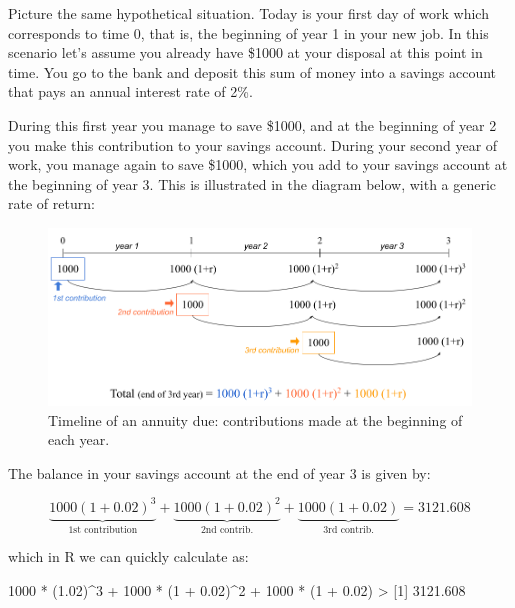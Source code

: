 \documentclass[
]{book}
\newenvironment{Shaded}{\begin{snugshade}}{\end{snugshade}}
\newcommand{\DecValTok}[1]{\textcolor[rgb]{0.00,0.00,0.81}{#1}}
\newcommand{\FloatTok}[1]{\textcolor[rgb]{0.00,0.00,0.81}{#1}}
\newcommand{\NormalTok}[1]{#1}
\newcommand{\SpecialCharTok}[1]{\textcolor[rgb]{0.00,0.00,0.00}{#1}}
\begin{document}
Picture the same hypothetical situation. Today is your first day of work
which corresponds to time 0, that is, the beginning of year 1 in your new job.
In this scenario let's assume you already have \$1000 at your disposal
at this point in time. You go to the bank and deposit this sum of money into a
savings account that pays an annual interest rate of 2\%.

During this first year you manage to save \$1000, and at the beginning of year 2
you make this contribution to your savings account. During your second year of
work, you manage again to save \$1000, which you add to your savings account at
the beginning of year 3. This is illustrated in the diagram below, with a
generic rate of return:

\begin{figure}

{\centering \includegraphics[width=0.95\linewidth]{images/conditionals/timeline-due-annuity} 

}

\caption{Timeline of an annuity due: contributions made at the beginning of each year.}\label{fig:unnamed-chunk-262}
\end{figure}

The balance in your savings account at the end of year 3 is given by:

\[
\underbrace{1000 (1 + 0.02)^3}_{\text{1st contribution}} + \underbrace{1000 (1 + 0.02)^2}_{\text{2nd contrib.}} + \underbrace{1000 (1 + 0.02)}_{\text{3rd contrib.}} = 3121.608
\]

which in R we can quickly calculate as:

\begin{Shaded}
\begin{Highlighting}[]
\DecValTok{1000} \SpecialCharTok{*}\NormalTok{ (}\FloatTok{1.02}\NormalTok{)}\SpecialCharTok{\^{}}\DecValTok{3} \SpecialCharTok{+} \DecValTok{1000} \SpecialCharTok{*}\NormalTok{ (}\DecValTok{1} \SpecialCharTok{+} \FloatTok{0.02}\NormalTok{)}\SpecialCharTok{\^{}}\DecValTok{2} \SpecialCharTok{+} \DecValTok{1000} \SpecialCharTok{*}\NormalTok{ (}\DecValTok{1} \SpecialCharTok{+} \FloatTok{0.02}\NormalTok{)}
\SpecialCharTok{\textgreater{}}\NormalTok{ [}\DecValTok{1}\NormalTok{] }\FloatTok{3121.608}
\end{Highlighting}
\end{Shaded}
\end{document}
